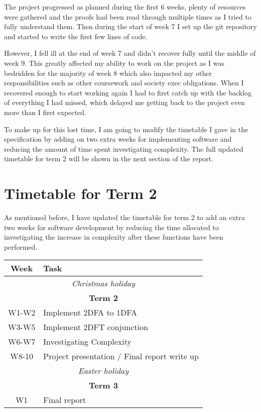 \documentclass[12pt, a4paper]{article}
\begin{document}
The project progressed as planned during the first 6 weeks, plenty of resources were gathered and the proofs had been read through multiple times as I tried to fully understand them. Then during the start of week 7 I set up the git repository and started to write the first few lines of code.

However, I fell ill at the end of week 7 and didn't recover fully until the middle of week 9. This greatly affected my ability to work on the project as I was bedridden for the majority of week 8 which also impacted my other responsibilities such as other coursework and society exec obligations. When I recovered enough to start working again I had to first catch up with the backlog of everything I had missed, which delayed me getting back to the project even more than I first expected.

To make up for this lost time, I am going to modify the timetable I gave in the specification by adding on two extra weeks for implementing software and reducing the amount of time spent investigating complexity. The full updated timetable for term 2 will be shown in the next section of the report.

\section{Timetable for Term 2}

As mentioned before, I have updated the timetable for term 2 to add an extra two weeks for software development by reducing the time allocated to investigating the increase in complexity after these functions have been performed.

\begin{center}
    \begin{tabular}{| c | p{8cm} |}
        \hline
        \textbf{Week} & \textbf{Task} \\
        \hline
        \multicolumn{2}{|c|}{\textit{Christmas holiday}}\\
        \hline
        \multicolumn{2}{|c|}{\textbf{Term 2}} \\
        \hline
        W1-W2 & Implement 2DFA to 1DFA \\
        W3-W5 & Implement 2DFT conjunction \\
        W6-W7 & Investigating Complexity \\
        W8-10 & Project presentation / Final report write up \\
        \hline
        \multicolumn{2}{|c|}{\textit{Easter holiday}}\\
        \hline
        \multicolumn{2}{|c|}{\textbf{Term 3}}\\
        \hline
        W1 & Final report\\
        \hline
    \end{tabular}
\end{center}
\end{document}
